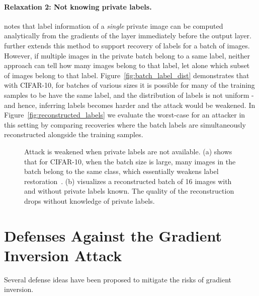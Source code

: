 \paragraph{Relaxation 2: Not knowing private labels.}  \citep{zhao2020idlg} notes that label information of a {\em single} private image can be computed analytically from the gradients of the layer immediately before the output layer. \citep{yin2021see} further extends this method to support recovery of labels for a batch of images. However, if multiple images in the private batch belong to a same label, neither approach can tell how many images belong to that label, let alone which subset of images belong to that label. Figure~\ref{fig:batch_label_dist} demonstrates that with CIFAR-10, for batches of various sizes it is possible for many of the training samples to be have the same label, and the distribution of labels is not uniform - and hence, inferring labels becomes harder and the attack would be weakened. In Figure~\ref{fig:reconstructed_labels} we evaluate the worst-case for an attacker in this setting by comparing recoveries where the batch labels are simultaneously reconstructed alongside the training samples. 


\begin{figure}[t]
    \centering
    \caption{ Attack is weakened when private labels are not available. (a) shows that for CIFAR-10, when the batch size is large, many images in the batch belong to the same class, which essentially weakens label restoration~\citep{zhao2020idlg, yin2021see}. (b) visualizes a reconstructed batch of 16 images with and without private labels known. The quality of the reconstruction drops without knowledge of private labels. 
    }
    \vspace{-3mm}
\end{figure}


\section{Defenses Against the Gradient Inversion Attack}
\label{sec:defense}

Several defense ideas have been proposed to mitigate the risks of gradient inversion.


